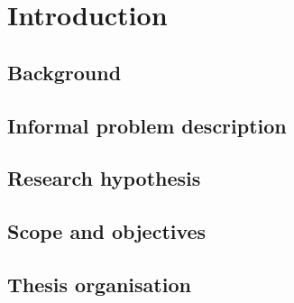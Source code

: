 %
%


\chapter{Introduction}
\vspace{-2em}
\minitoc

\startarabicpagenumbering %


\blindtext

\section{Background}

\blindtext

\section{Informal problem description}

\blindtext

\section{Research hypothesis}

\Blindtext

\section{Scope and objectives}

\Blindtext

\section{Thesis organisation}

\Blindtext